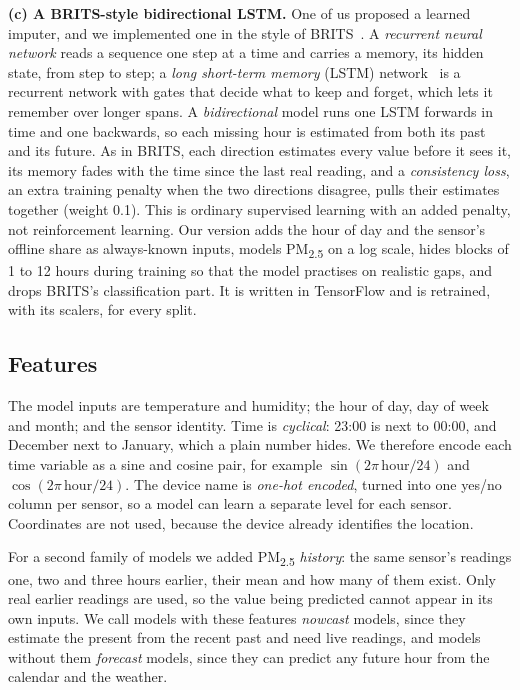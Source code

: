 \documentclass{ieeeaccess}
\newcommand{\pmtwo}{PM\textsubscript{2.5}}
\begin{document}
\textbf{(c) A BRITS-style bidirectional LSTM.} One of us proposed a learned imputer, and we implemented one in the style of BRITS~\cite{cao2018}. A \emph{recurrent neural network} reads a sequence one step at a time and carries a memory, its hidden state, from step to step; a \emph{long short-term memory} (LSTM) network~\cite{hochreiter1997} is a recurrent network with gates that decide what to keep and forget, which lets it remember over longer spans. A \emph{bidirectional} model runs one LSTM forwards in time and one backwards, so each missing hour is estimated from both its past and its future. As in BRITS, each direction estimates every value before it sees it, its memory fades with the time since the last real reading, and a \emph{consistency loss}, an extra training penalty when the two directions disagree, pulls their estimates together (weight 0.1). This is ordinary supervised learning with an added penalty, not reinforcement learning. Our version adds the hour of day and the sensor's offline share as always-known inputs, models \pmtwo{} on a log scale, hides blocks of 1 to 12 hours during training so that the model practises on realistic gaps, and drops BRITS's classification part. It is written in TensorFlow and is retrained, with its scalers, for every split.

\subsection{Features}
The model inputs are temperature and humidity; the hour of day, day of week and month; and the sensor identity. Time is \emph{cyclical}: 23:00 is next to 00:00, and December next to January, which a plain number hides. We therefore encode each time variable as a sine and cosine pair, for example $\sin(2\pi\,\mathrm{hour}/24)$ and $\cos(2\pi\,\mathrm{hour}/24)$. The device name is \emph{one-hot encoded}, turned into one yes/no column per sensor, so a model can learn a separate level for each sensor. Coordinates are not used, because the device already identifies the location.

For a second family of models we added \pmtwo{} \emph{history}: the same sensor's readings one, two and three hours earlier, their mean and how many of them exist. Only real earlier readings are used, so the value being predicted cannot appear in its own inputs. We call models with these features \emph{nowcast} models, since they estimate the present from the recent past and need live readings, and models without them \emph{forecast} models, since they can predict any future hour from the calendar and the weather.
\end{document}
